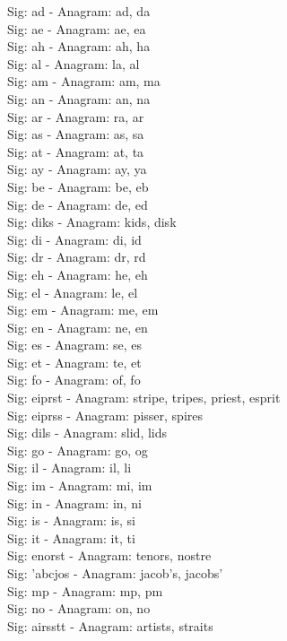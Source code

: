 Sig: {ad} - Anagram: ad, da \\
Sig: {ae} - Anagram: ae, ea \\
Sig: {ah} - Anagram: ah, ha \\
Sig: {al} - Anagram: la, al \\
Sig: {am} - Anagram: am, ma \\
Sig: {an} - Anagram: an, na \\
Sig: {ar} - Anagram: ra, ar \\
Sig: {as} - Anagram: as, sa \\
Sig: {at} - Anagram: at, ta \\
Sig: {ay} - Anagram: ay, ya \\
Sig: {be} - Anagram: be, eb \\
Sig: {de} - Anagram: de, ed \\
Sig: {diks} - Anagram: kids, disk \\
Sig: {di} - Anagram: di, id \\
Sig: {dr} - Anagram: dr, rd \\
Sig: {eh} - Anagram: he, eh \\
Sig: {el} - Anagram: le, el \\
Sig: {em} - Anagram: me, em \\
Sig: {en} - Anagram: ne, en \\
Sig: {es} - Anagram: se, es \\
Sig: {et} - Anagram: te, et \\
Sig: {fo} - Anagram: of, fo \\
Sig: {eiprst} - Anagram: stripe, tripes, priest, esprit \\
Sig: {eiprss} - Anagram: pisser, spires \\
Sig: {dils} - Anagram: slid, lids \\
Sig: {go} - Anagram: go, og \\
Sig: {il} - Anagram: il, li \\
Sig: {im} - Anagram: mi, im \\
Sig: {in} - Anagram: in, ni \\
Sig: {is} - Anagram: is, si \\
Sig: {it} - Anagram: it, ti \\
Sig: {enorst} - Anagram: tenors, nostre \\
Sig: {'abcjos} - Anagram: jacob's, jacobs' \\
Sig: {mp} - Anagram: mp, pm \\
Sig: {no} - Anagram: on, no \\
Sig: {airsstt} - Anagram: artists, straits \\
